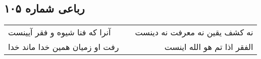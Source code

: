 \begin{center}
\section*{رباعی شماره ۱۰۵}
\label{sec:sh105}
\begin{longtable}{l p{0.5cm} r}
آنرا که فنا شیوه و فقر آیینست
&&
نه کشف یقین نه معرفت نه دینست
\\
رفت او زمیان همین خدا ماند خدا
&&
الفقر اذا تم هو الله اینست
\\
\end{longtable}
\end{center}
